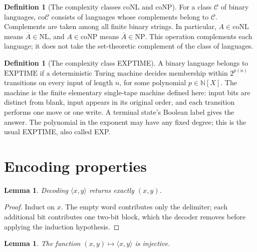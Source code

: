\documentclass[11pt]{article}
\newtheorem{lemma}[theorem]{Lemma}
\theoremstyle{definition}
\newtheorem{definition}[theorem]{Definition}
\begin{document}
\begin{definition}[The complexity classes coNL and coNP]\leavevmode
For a class $\mathcal C$ of binary languages, $\mathrm{co}\mathcal C$
consists of languages whose complements belong to $\mathcal C$.
Complements are taken among all finite binary strings. In particular,
$A\in\mathrm{coNL}$ means $\overline A\in\mathrm{NL}$, and
$A\in\mathrm{coNP}$ means $\overline A\in\mathrm{NP}$.
This operation complements each language; it does not take the set-theoretic
complement of the class of languages.
\end{definition}

\begin{definition}[The complexity class EXPTIME]\leavevmode
A binary language belongs to $\mathrm{EXPTIME}$ if a deterministic Turing
machine decides membership within $2^{p(n)}$ transitions on every input
of length $n$, for some polynomial $p\in\mathbb{N}[X]$.
The machine is the finite elementary single-tape machine defined here:
input bits are distinct from blank, input appears in its original order,
and each transition performs one move or one write. A terminal state's
Boolean label gives the answer. The polynomial in the exponent may have
any fixed degree; this is the usual EXPTIME, also called EXP.
\end{definition}

\section{Encoding properties}

\begin{lemma}\leavevmode
Decoding $\langle x,y\rangle$ returns exactly $(x,y)$.
\end{lemma}

\begin{proof}\leavevmode
Induct on $x$. The empty word contributes only the delimiter; each additional bit contributes one two-bit block, which the decoder removes before applying the induction hypothesis.
\qedhere
\end{proof}

\begin{lemma}\leavevmode
The function $(x,y)\mapsto\langle x,y\rangle$ is injective.
\end{lemma}
\end{document}
